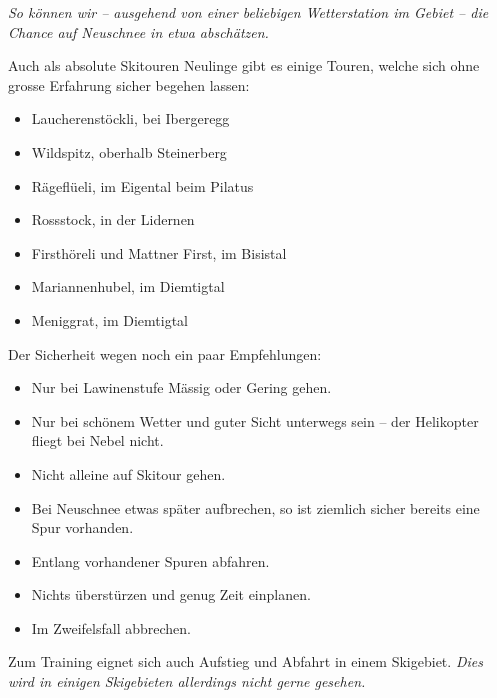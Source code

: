 \textit{So können wir -- ausgehend von einer beliebigen Wetterstation im Gebiet -- die Chance auf Neuschnee in etwa abschätzen.}

\newcolumn

Auch als absolute Skitouren Neulinge gibt es einige Touren, welche sich ohne grosse Erfahrung sicher begehen lassen:

\begin{itemize}
  \item{Laucherenstöckli, bei Ibergeregg}
  \item{Wildspitz, oberhalb Steinerberg}
  \item{Rägeflüeli, im Eigental beim Pilatus}
  \item{Rossstock, in der Lidernen}
  \item{Firsthöreli und Mattner First, im Bisistal}
  \item{Mariannenhubel, im Diemtigtal}
  \item{Meniggrat, im Diemtigtal}
\end{itemize}

Der Sicherheit wegen noch ein paar Empfehlungen:

\begin{itemize}
  \item{Nur bei Lawinenstufe Mässig oder Gering gehen.}
  \item{Nur bei schönem Wetter und guter Sicht unterwegs sein -- der Helikopter fliegt bei Nebel nicht.}
  \item{Nicht alleine auf Skitour gehen.}
  \item{Bei Neuschnee etwas später aufbrechen, so ist ziemlich sicher bereits eine Spur vorhanden.}
  \item{Entlang vorhandener Spuren abfahren.}
  \item{Nichts überstürzen und genug Zeit einplanen.}
  \item{Im Zweifelsfall abbrechen.}
\end{itemize}

Zum Training eignet sich auch Aufstieg und Abfahrt in einem Skigebiet.
\textit{Dies wird in einigen Skigebieten allerdings nicht gerne gesehen.}
